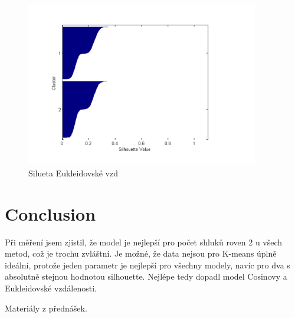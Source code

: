 \documentclass[journal]{IEEEtran}
\begin{document}
\begin{figure}[!h]
\begin{center}
\includegraphics[width=4in]{euklid.pdf}
\caption{Silueta Eukleidovsk\'{e} vzd }
\end{center}\label{f-ac}
\end{figure}


\section{Conclusion}
P\v{r}i m\v{e}\v{r}en\'{i} jsem zjistil, \v{z}e model je nejlep\v{s}\'{i} pro po\v{c}et shluk\r{u} roven 2 u v\v{s}ech metod, co\v{z} je trochu zvl\'{a}\v{s}tn\'{i}. Je mo\v{z}n\'{e}, \v{z}e data nejsou pro K-means \'{u}pln\v{e} ide\'{a}ln\'{i}, proto\v{z}e jeden parametr je nejlep\v{s}\'{i} pro v\v{s}echny modely, nav\'{i}c pro dva s absolutn\v{e} stejnou hodnotou silhouette. Nejl\'{e}pe tedy dopadl model Cosinovy a Eukleidovsk\'{e} vzd\'{a}lenosti.

\begin{literatura}{1}
Materi\'{a}ly z p\v{r}edn\'{a}\v{s}ek.

\end{literatura}
\end{document}
